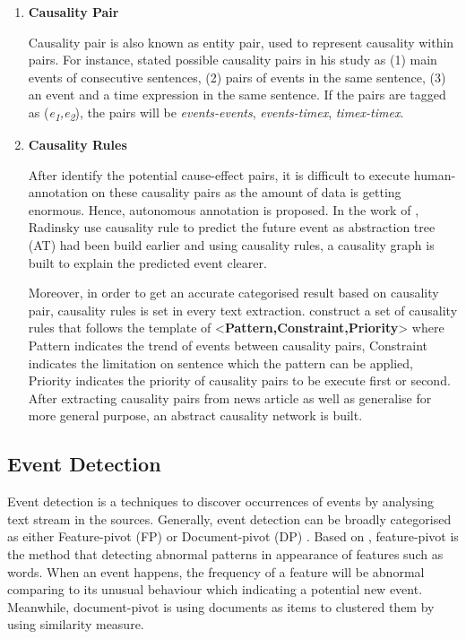 \documentclass[twoside]{utmthesis}
\begin{document}
\begin{enumerate}
	\item \textbf{Causality Pair}
	
	Causality pair is also known as entity pair, used to represent causality within pairs. For instance, \cite{mirza2014extracting} stated possible causality pairs in his study as (1) main events of consecutive sentences, (2) pairs of events in the same sentence, (3) an event and a time expression in the same sentence. If the pairs are tagged as (\textit{e\textsubscript{1},e\textsubscript{2}}), the pairs will be \textit{events-events}, \textit{events-timex}, \textit{timex-timex}. 
	
	\item \textbf{Causality Rules}
	
	After identify the potential cause-effect pairs, it is difficult to execute human-annotation on these causality pairs as the amount of data is getting enormous. Hence, autonomous annotation is proposed. 	In the work of \cite{radinsky2012learning}, Radinsky use causality rule to predict the future event as abstraction tree (AT) had been build earlier and using causality rules, a causality graph is built to explain the predicted event clearer.
	
	Moreover, in order to get an accurate categorised result based on causality pair, causality rules is set in every text extraction. \cite{zhao2017constructing} construct a set of causality rules that follows the template of <\textbf{Pattern,Constraint,Priority}> where Pattern indicates the trend of events between causality pairs, Constraint indicates the limitation on sentence which the pattern can be applied, Priority indicates the priority of causality pairs to be execute first or second. After extracting causality pairs from news article as well as generalise for more general purpose, an abstract causality network is built. 
		
\end{enumerate}

\subsection{Event Detection}
Event detection is a techniques to discover occurrences of events by analysing text stream in the sources. Generally, event detection can be broadly categorised as either Feature-pivot (FP) or Document-pivot (DP) \citep{fedoryszak2019real}. Based on \cite{chen2019bibliometric}, feature-pivot is the method that detecting abnormal patterns in appearance of features such as words. When an event happens, the frequency of a feature will be abnormal comparing to its unusual behaviour which indicating a potential new event. Meanwhile, document-pivot is using documents as items to clustered them by using similarity measure. 
\end{document}
